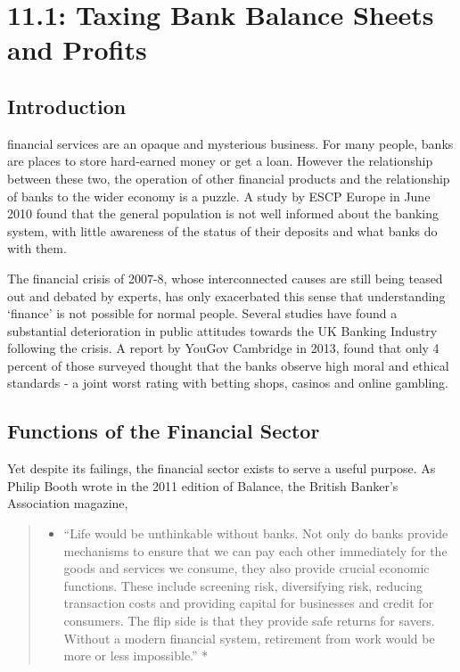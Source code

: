 \documentclass[]{tufte-handout}
\providecommand{\tightlist}{%
  \setlength{\itemsep}{0pt}\setlength{\parskip}{0pt}}
\begin{document}
\hypertarget{taxing-bank-balance-sheets-and-profits}{%
\section{11.1: Taxing Bank Balance Sheets and
Profits}\label{taxing-bank-balance-sheets-and-profits}}

\hypertarget{introduction-1}{%
\subsection{Introduction}\label{introduction-1}}

 financial services are an opaque and
mysterious business. For many people, banks are places to store
hard-earned money or get a loan. However the relationship between these
two, the operation of other financial products and the relationship of
banks to the wider economy is a puzzle. A study by ESCP Europe in June
2010 found that the general population is not well informed about the
banking system, with little awareness of the status of their deposits
and what banks do with them.

The financial crisis of 2007-8, whose interconnected causes are still
being teased out and debated by experts, has only exacerbated this sense
that understanding `finance' is not possible for normal people. Several
studies have found a substantial deterioration in public attitudes
towards the UK Banking Industry following the crisis. A report by YouGov
Cambridge in 2013, found that only 4 percent of those surveyed thought
that the banks observe high moral and ethical standards - a joint worst
rating with betting shops, casinos and online gambling.

\hypertarget{functions-of-the-financial-sector}{%
\subsection{Functions of the Financial
Sector}\label{functions-of-the-financial-sector}}

Yet despite its failings, the financial sector exists to serve a useful
purpose. As Philip Booth wrote in the 2011 edition of Balance, the
British Banker's Association magazine,

\begin{quote}
\begin{itemize}
\tightlist
\item
  ``Life would be unthinkable without banks. Not only do banks provide
  mechanisms to ensure that we can pay each other immediately for the
  goods and services we consume, they also provide crucial economic
  functions. These include screening risk, diversifying risk, reducing
  transaction costs and providing capital for businesses and credit for
  consumers. The flip side is that they provide safe returns for savers.
  Without a modern financial system, retirement from work would be more
  or less impossible.'' *
\end{itemize}
\end{quote}
\end{document}
